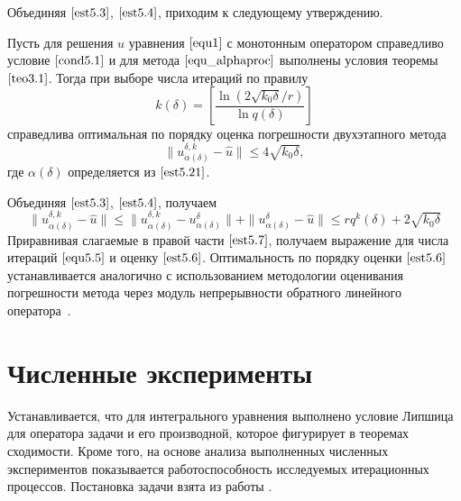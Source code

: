 Объединяя $\eqref{est5.3}$, $\eqref{est5.4}$, приходим к следующему утверждению.
\begin{theorem}\label{teo5.1}
	Пусть для решения $\hat{u}$ уравнения $\eqref{equ1}$ с монотонным оператором справедливо условие $\eqref{cond5.1}$ и для метода $\eqref{equ_alphaproc}$ выполнены условия теоремы~$\ref{teo3.1}$. Тогда при выборе числа итераций по правилу
	\begin{equation}\label{equ5.5}
	k(\delta)=\left[\frac{\ln(2\sqrt{k_0\delta}/r)}{\ln q(\delta)}\right]
	\end{equation}
	справедлива оптимальная по порядку оценка погрешности двухэтапного метода
	\begin{equation}\label{est5.6}
	\|u_{\alpha(\delta)}^{\delta, k}-\hat{u}\|\le 4\sqrt{k_0 \delta},
	\end{equation}
	где $\alpha(\delta)$ определяется из $\eqref{est5.21}$.
\end{theorem}
\proof Объединяя $\eqref{est5.3}$, $\eqref{est5.4}$, получаем
\begin{equation}\label{est5.7}
\|u_{\alpha(\delta)}^{\delta, k}-\hat{u}\|\le\|u_{\alpha(\delta)}^{\delta, k}-u_{\alpha(\delta)}^{\delta}\|+\|u_{\alpha(\delta)}^{\delta}-\hat{u}\|\le rq^k(\delta)+ 2\sqrt{k_0\delta}
\end{equation}
Приравнивая слагаемые в правой части $\eqref{est5.7}$, получаем выражение для числа итераций $\eqref{equ5.5}$ и оценку $\eqref{est5.6}$. Оптимальность по порядку оценки $\eqref{est5.6}$ устанавливается аналогично \cite{Vasin2015} с использованием методологии оценивания погрешности метода через модуль непрерывности обратного линейного оператора~\cite{Ivanov1974, IvaVasTan2002}.

\newpage
\section{Численные эксперименты}

Устанавливается, что для интегрального уравнения выполнено условие Липшица для оператора задачи и его производной, которое фигурирует в теоремах сходимости. Кроме того, на основе анализа выполненных численных экспериментов показывается работоспособность исследуемых итерационных процессов. Постановка задачи взята из работы \cite{Tau2002}.

